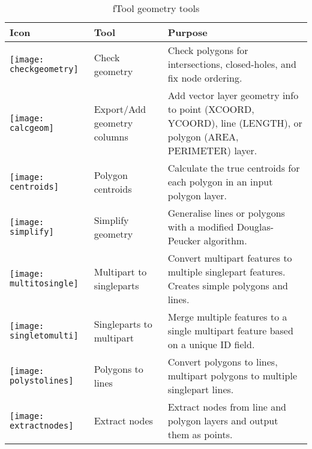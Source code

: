 \begin{table}[ht]
\centering
\caption{fTool geometry tools}\label{tab:ftool_geometry}\medskip
 \begin{tabular}{|p{0.3in}|p{1.2in}|p{4.8in}|}
 \hline \textbf{Icon} & \textbf{Tool} & \textbf{Purpose} \\
 \hline \texttt{[image: checkgeometry]} & Check geometry & 
Check polygons for intersections, closed-holes, and fix node ordering. \\
 \hline \texttt{[image: calcgeom]} & Export/Add geometry 
columns & Add vector layer geometry info to point (XCOORD, YCOORD), 
line (LENGTH), or polygon (AREA, PERIMETER) layer. \\
 \hline \texttt{[image: centroids]} & Polygon centroids & 
Calculate the true centroids for each polygon in an input polygon layer. \\
 \hline \texttt{[image: simplify]} & Simplify geometry & 
Generalise lines or polygons with a modified Douglas-Peucker algorithm. \\
 \hline \texttt{[image: multitosingle]} & Multipart to 
singleparts & Convert multipart features to multiple singlepart features. 
Creates simple polygons and lines. \\
 \hline \texttt{[image: singletomulti]} & Singleparts to 
multipart & Merge multiple features to a single multipart feature based 
on a unique ID field. \\
 \hline \texttt{[image: polystolines]} & Polygons to lines 
& Convert polygons to lines, multipart polygons to multiple singlepart lines. \\
 \hline \texttt{[image: extractnodes]} & Extract nodes & 
Extract nodes from line and polygon layers and output them as points. \\
 \hline
\end{tabular}
\end{table}


